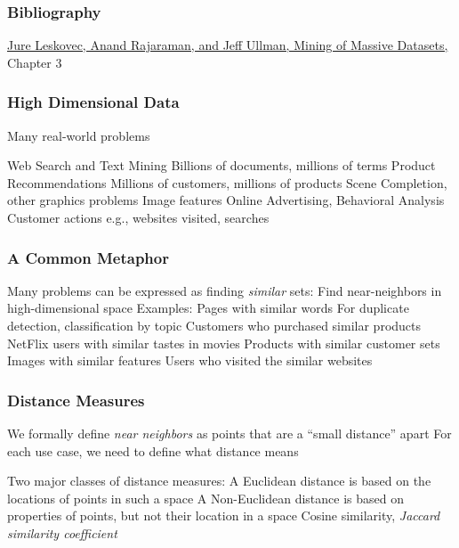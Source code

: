 \documentclass[svgnames]{beamer}
\subtitle{Similarity Search}
\begin{document}
\maketitle
\makeoutline

\begin{frame}
    \frametitle{Bibliography}
    \href{http://www.mmds.org}{Jure Leskovec, Anand Rajaraman, and Jeff Ullman, Mining of Massive Datasets,} Chapter 3
\end{frame}

\begin{frame} \frametitle{High Dimensional Data}

Many real-world problems

Web Search and Text Mining
  Billions of documents, millions of terms
Product Recommendations
  Millions of customers, millions of products
Scene Completion, other graphics problems
  Image features
Online Advertising, Behavioral Analysis
  Customer actions e.g., websites visited, searches
\end{frame}

  
\begin{frame} \frametitle{A Common Metaphor}

Many problems can be expressed as finding \emph{similar} sets:
Find near-neighbors in high-dimensional space
Examples:
  Pages with similar words
    For duplicate detection, classification by topic
  Customers who purchased similar products
    NetFlix users with similar tastes in movies
	Products with similar customer sets
  Images with similar features
  Users who visited the similar websites

\end{frame}

  
\begin{frame} \frametitle{Distance Measures}

We formally define \emph{near neighbors} as points that are a “small distance” apart
For each use case, we need to define what distance means

Two major classes of distance measures:
  A Euclidean distance is based on the locations of points in such a space
  A Non-Euclidean distance is based on properties of points, but not their location in a space
     Cosine similarity, \emph{Jaccard similarity coefficient}
  
\end{frame}

  
\end{document}
